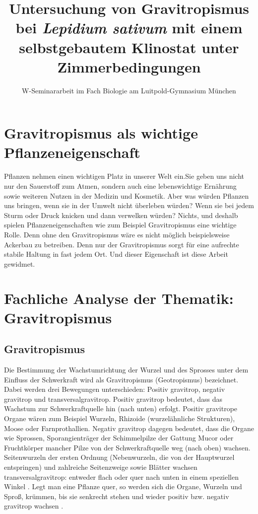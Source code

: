 \documentclass[
a4paper, 
11pt, 
ngerman,
listof=totoc,
bibliography=totocnumbered
]{scrreprt}
\title{Untersuchung von Gravitropismus bei \emph{Lepidium sativum} mit einem selbstgebautem Klinostat unter Zimmerbedingungen}
\subtitle{W-Seminararbeit im Fach Biologie am Luitpold-Gymnasium München}
\begin{document}
\maketitle
\tableofcontents

\chapter{Gravitropismus als wichtige Pflanzeneigenschaft}
Pflanzen nehmen einen wichtigen Platz in unserer Welt ein.Sie geben uns nicht nur den Sauerstoff zum Atmen, sondern auch eine lebenswichtige Ernährung sowie weiteren Nutzen in der Medizin und Kosmetik. Aber was würden Pflanzen uns bringen, wenn sie in der Umwelt nicht überleben würden? Wenn sie bei jedem Sturm oder Druck knicken und dann verwelken würden? Nichts, und deshalb spielen Pflanzeneigenschaften wie zum Beispiel Gravitropismus eine wichtige Rolle. Denn ohne den Gravitropismus wäre es nicht möglich beispielsweise Ackerbau zu betreiben. Denn nur der Gravitropismus sorgt für eine aufrechte stabile Haltung in fast jedem Ort. Und dieser Eigenschaft ist diese Arbeit gewidmet. 

\chapter{Fachliche Analyse der Thematik: Gravitropismus}

\section{Gravitropismus}
Die Bestimmung der Wachstumrichtung der Wurzel und des Sprosses unter dem Einfluss der Schwerkraft wird als Gravitropismus (Geotropismus) bezeichnet. Dabei werden drei Bewegungen unterschieden: Positiv gravitrop, negativ gravitrop und transversalgravitrop. Positiv gravitrop bedeutet, dass das Wachstum zur Schwerkraftquelle hin (nach unten) erfolgt. Positiv gravitrope Organe wären zum Beispiel Wurzeln, Rhizoide (wurzelähnliche Strukturen), Moose oder Farnprothallien. Negativ gravitrop dagegen bedeutet, dass die Organe wie Sprossen, Sporangienträger der Schimmelpilze der Gattung Mucor oder Fruchtkörper mancher Pilze von der Schwerkraftquelle weg (nach oben) wachsen. Seitenwurzeln der ersten Ordnung (Nebenwurzeln, die von der Hauptwurzel entspringen) und zahlreiche Seitenzweige sowie Blätter wachsen transversalgravitrop: entweder flach oder quer nach unten in einem speziellen Winkel 
\parencite[449]{Strasburger}. 
Legt man eine Pflanze quer, so werden sich die Organe, Wurzeln und Sproß, krümmen, bis sie senkrecht stehen und wieder positiv bzw. negativ gravitrop wachsen
\parencite[528]{Luettge}.
\end{document}
